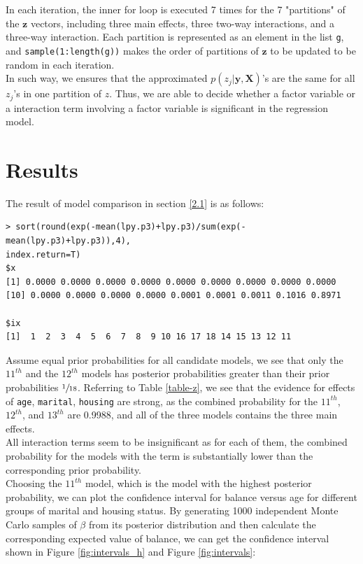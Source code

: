 \documentclass[a4page]{article}
\begin{document}
    In each iteration, the inner for loop is executed 7 times for the 7 "partitions" of the $\bm{z}$ vectors, including three main effects, three two-way interactions, and a three-way interaction. Each partition is represented as an element in the list \verb|g|, and \verb|sample(1:length(g))| makes the order of partitions of $\bm{z}$ to be updated to be random in each iteration.\\
    In such way, we ensures that the approximated $p(z_j|\bm{y},\bm{X})$'s are the same for all $z_j$'s in one partition of $z$. Thus, we are able to decide whether a factor variable or a interaction term involving a factor variable is significant in the regression model.
	
	\section{Results \label{results}}
	The result of model comparison in section \ref{2.1} is as follows:
    \begin{verbatim}
> sort(round(exp(-mean(lpy.p3)+lpy.p3)/sum(exp(-mean(lpy.p3)+lpy.p3)),4),
index.return=T)
$x
[1] 0.0000 0.0000 0.0000 0.0000 0.0000 0.0000 0.0000 0.0000 0.0000
[10] 0.0000 0.0000 0.0000 0.0000 0.0001 0.0001 0.0011 0.1016 0.8971

$ix
[1]  1  2  3  4  5  6  7  8  9 10 16 17 18 14 15 13 12 11
    \end{verbatim}
    Assume equal prior probabilities for all candidate models, we see that only the $11^{th}$ and the $12^{th}$ models has posterior probabilities greater than their prior probabilities $\sfrac{1}{18}$. Referring to Table \ref{table-z}, we see that the evidence for effects of \verb|age|, \verb|marital|, \verb|housing| are strong, as the combined probability for the $11^{th}$, $12^{th}$, and $13^{th}$ are 0.9988, and all of the three models contains the three main effects.\\
    All interaction terms seem to be insignificant as for each of them, the combined probability for the models with the term is substantially lower than the corresponding prior probability.\\
    Choosing the $11^{th}$ model, which is the model with the highest posterior probability, we can plot the confidence interval for balance versus age for different groups of marital and housing status. By generating 1000 independent Monte Carlo samples of $\beta$ from its posterior distribution and then calculate the corresponding expected value of balance, we can get the confidence interval shown in Figure \ref{fig:intervals_h} and Figure \ref{fig:intervals}:
\end{document}
